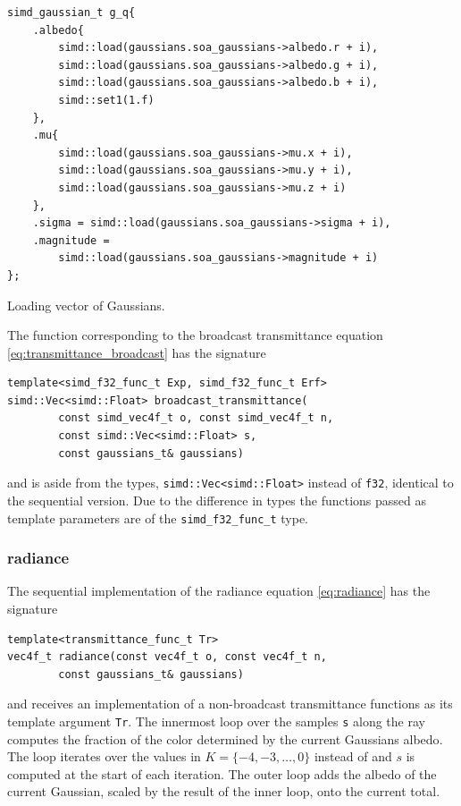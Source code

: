 \documentclass[a4paper, 11pt]{memoir}
\begin{document}
    \begin{listing}[H]
        \begin{verbatim}
simd_gaussian_t g_q{
    .albedo{
        simd::load(gaussians.soa_gaussians->albedo.r + i),
        simd::load(gaussians.soa_gaussians->albedo.g + i),
        simd::load(gaussians.soa_gaussians->albedo.b + i),
        simd::set1(1.f)
    },
    .mu{
        simd::load(gaussians.soa_gaussians->mu.x + i),
        simd::load(gaussians.soa_gaussians->mu.y + i),
        simd::load(gaussians.soa_gaussians->mu.z + i)
    },
    .sigma = simd::load(gaussians.soa_gaussians->sigma + i),
    .magnitude =
        simd::load(gaussians.soa_gaussians->magnitude + i)
};
        \end{verbatim}
        \caption{Loading vector of Gaussians.}
        \label{lst:gaussian_load}
    \end{listing}

    The function corresponding to the broadcast \gls{transmittance} equation \eqref{eq:transmittance_broadcast} has the
    signature
    \begin{verbatim}
template<simd_f32_func_t Exp, simd_f32_func_t Erf>
simd::Vec<simd::Float> broadcast_transmittance(
        const simd_vec4f_t o, const simd_vec4f_t n,
        const simd::Vec<simd::Float> s,
        const gaussians_t& gaussians)
    \end{verbatim}
    and is aside from the types, \texttt{simd::Vec<simd::Float>} instead of \texttt{f32}, identical
    to the sequential version. Due to the difference in types the functions passed as template parameters are of the
    \texttt{simd_f32_func_t} type.
    
    \subsubsection{\gls{radiance}}
    The sequential implementation of the \gls{radiance} equation \eqref{eq:radiance} has the signature
    \begin{verbatim}
template<transmittance_func_t Tr>
vec4f_t radiance(const vec4f_t o, const vec4f_t n,
        const gaussians_t& gaussians)
    \end{verbatim}
    and receives an implementation of a non-broadcast \gls{transmittance} functions as its template argument
    \texttt{Tr}. The innermost loop over the samples \texttt{s} along the ray computes the fraction
    of the color determined by the current Gaussians \gls{albedo}. The loop iterates over the values in
    $K = \{-4, -3, \dots, 0\}$ instead of and $s$ is computed at the start of each iteration. The outer loop adds the
    \gls{albedo} of the current Gaussian, scaled by the result of the inner loop, onto the current total.
    
\end{document}
